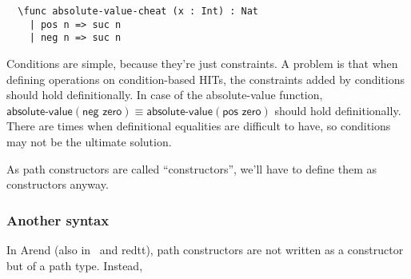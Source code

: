 \begin{verbatim}
  \func absolute-value-cheat (x : Int) : Nat
    | pos n => suc n
    | neg n => suc n
\end{verbatim}


Conditions are simple, because they're just constraints.
A problem is that when defining operations on condition-based HITs,
the constraints added by conditions should hold definitionally.
In case of the \textsf{absolute-value} function,
$\textsf{absolute-value}(\textsf{neg zero}) \equiv
\textsf{absolute-value}(\textsf{pos zero})$ should hold definitionally.
There are times when definitional equalities are difficult to have,
so conditions may not be the ultimate solution.

As path constructors are called ``constructors'',
we'll have to define them as constructors anyway.




\subsubsection{Another syntax}

In Arend (also in \RedPRL\ and redtt),
path constructors are not written as a constructor but of a path type.
Instead,

\TODO


